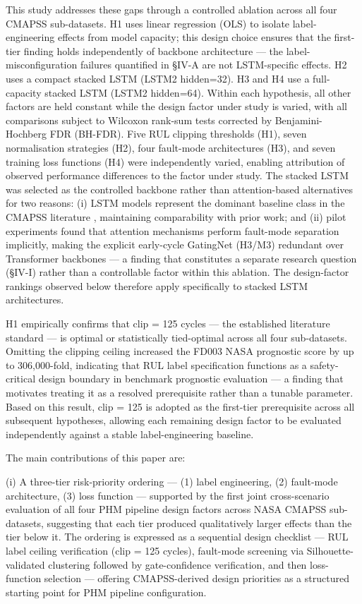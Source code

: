 \documentclass[review,12pt]{elsarticle}
\begin{document}
This study addresses these gaps through a controlled ablation across all four CMAPSS sub-datasets. H1 uses linear regression (OLS) to isolate label-engineering effects from model capacity; this design choice ensures that the first-tier finding holds independently of backbone architecture --- the label-misconfiguration failures quantified in \S{}IV-A are not LSTM-specific effects. H2 uses a compact stacked LSTM (LSTM2 hidden=32). H3 and H4 use a full-capacity stacked LSTM (LSTM2 hidden=64). Within each hypothesis, all other factors are held constant while the design factor under study is varied, with all comparisons subject to Wilcoxon rank-sum tests corrected by Benjamini-Hochberg FDR (BH-FDR). Five RUL clipping thresholds (H1), seven normalisation strategies (H2), four fault-mode architectures (H3), and seven training loss functions (H4) were independently varied, enabling attribution of observed performance differences to the factor under study. The stacked LSTM was selected as the controlled backbone rather than attention-based alternatives for two reasons: (i) LSTM models represent the dominant baseline class in the CMAPSS literature \cite{ref05,ref06,ref09}, maintaining comparability with prior work; and (ii) pilot experiments found that attention mechanisms perform fault-mode separation implicitly, making the explicit early-cycle GatingNet (H3/M3) redundant over Transformer backbones --- a finding that constitutes a separate research question (\S{}IV-I) rather than a controllable factor within this ablation. The design-factor rankings observed below therefore apply specifically to stacked LSTM architectures.

H1 empirically confirms that clip = 125 cycles — the established literature standard \cite{ref05,ref06} — is optimal or statistically tied-optimal across all four sub-datasets. Omitting the clipping ceiling increased the FD003 NASA prognostic score by up to 306,000-fold, indicating that RUL label specification functions as a safety-critical design boundary in benchmark prognostic evaluation --- a finding that motivates treating it as a resolved prerequisite rather than a tunable parameter. Based on this result, clip = 125 is adopted as the first-tier prerequisite across all subsequent hypotheses, allowing each remaining design factor to be evaluated independently against a stable label-engineering baseline.

The main contributions of this paper are:

(i) A three-tier risk-priority ordering --- (1) label engineering, (2) fault-mode architecture, (3) loss function --- supported by the first joint cross-scenario evaluation of all four PHM pipeline design factors across NASA CMAPSS sub-datasets, suggesting that each tier produced qualitatively larger effects than the tier below it. The ordering is expressed as a sequential design checklist --- RUL label ceiling verification (clip = 125 cycles), fault-mode screening via Silhouette-validated clustering followed by gate-confidence verification, and then loss-function selection --- offering CMAPSS-derived design priorities as a structured starting point for PHM pipeline configuration.
\end{document}
